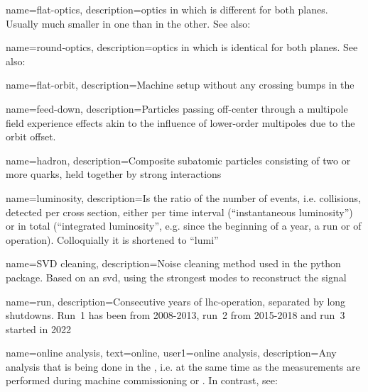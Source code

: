 {
        name=flat-optics,
        description={\Gls{optics} in which  is different for both planes. 
        Usually much smaller in one than in the other. 
        See also: }
}

{
        name=round-optics,
        description={\Gls{optics} in which  is identical for both planes.
        See also: } 
}

{
        name=flat-orbit,
        description={Machine setup without any crossing bumps in the }
}

{
        name=feed-down,
        description={Particles passing off-center through a multipole field experience effects 
        akin to the influence of lower-order multipoles due to the orbit offset.
        }
}

{
        name=hadron,
        description={Composite subatomic particles consisting of two or more quarks,
        held together by strong interactions}
}

{
        name=luminosity,
        description={Is the ratio of the number of events, i.e. collisions, detected per cross section,
        either per time interval (``instantaneous luminosity'') or in total 
        (``integrated luminosity'', e.g. since the beginning of a year, a \gls{run} or of operation).
        Colloquially it is shortened to ``lumi''}
}

{
        name={SVD cleaning},
        description={Noise cleaning method used in the  python package. 
        Based on an \acrfull{svd}, using the strongest modes to reconstruct the signal}
}

{
        name={run},
        description={Consecutive years of \acrshort{lhc}-operation, separated by 
        long shutdowns. Run~1 has been from 2008-2013, run~2 from 2015-2018 and run~3 started in 2022}
}

{
        name={online analysis},
        text=online,
        user1={online analysis},
        description={Any analysis that is being done in the , 
        i.e. at the same time as the measurements are performed during machine commissioning or .
        In contrast, see: }
}

